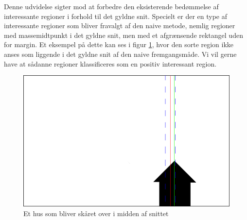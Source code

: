 {
Denne udvidelse sigter mod at forbedre den eksisterende bedømmelse af
interessante regioner i forhold til det gyldne snit. Specielt er der
en type af interessante regioner som bliver fravalgt af den naive
metode, nemlig regioner med massemidtpunkt i det gyldne snit, men med et
afgrænsende rektangel uden for margin. Et eksempel på dette kan ses i
figur \ref{hus}, hvor den sorte region ikke anses som liggende i det
gyldne snit af den naive fremgangsmåde. Vi vil gerne have at sådanne
regioner klassificeres som en positiv interessant region.


\begin{figure}[h]
	\begin{center}
		\includegraphics[scale=0.3,angle=0]{afsnit/vores_implementation/billeder/udvidet_loesning/husworks.png}
	\end{center}
	\caption[]{Et hus som bliver skåret over i midden af snittet}
	\label{hus}
\end{figure}




}
